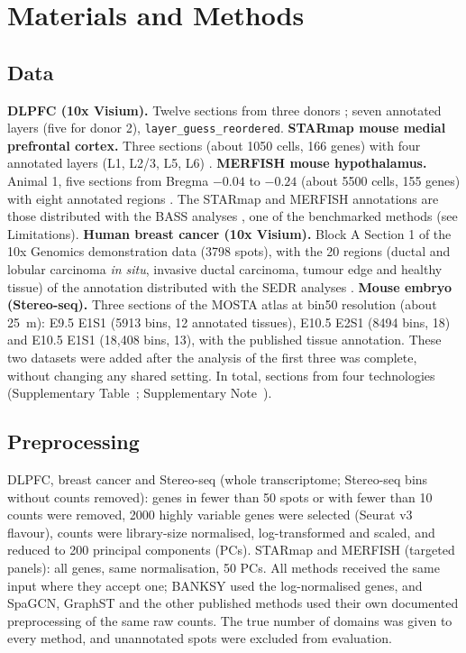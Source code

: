 \documentclass[unnumsec,webpdf,contemporary,large]{oup-authoring-template}
\begin{document}
\section{Materials and Methods}

\subsection{Data}
\textbf{DLPFC (10x Visium).} Twelve sections from three donors \citep{maynard2021dlpfc}; seven
annotated layers (five for donor 2), \texttt{layer\_guess\_reordered}.
\textbf{STARmap mouse medial prefrontal cortex.} Three sections (about 1050 cells, 166 genes) with
four annotated layers (L1, L2/3, L5, L6) \citep{wang2018starmap}.
\textbf{MERFISH mouse hypothalamus.} Animal 1, five sections from Bregma $-0.04$ to $-0.24$ (about
5500 cells, 155 genes) with eight annotated regions \citep{moffitt2018merfish}. The STARmap and
MERFISH annotations are those distributed with the BASS analyses \citep{li2022bass}, one of the benchmarked methods
(see Limitations).
\textbf{Human breast cancer (10x Visium).} Block A Section 1 of the 10x Genomics demonstration data \citep{tenx2020brca}
(3798 spots), with the 20 regions (ductal and lobular carcinoma \emph{in situ}, invasive ductal carcinoma, tumour edge and healthy
tissue) of the annotation distributed with the SEDR analyses \citep{xu2024sedr}.
\textbf{Mouse embryo (Stereo-seq).} Three sections of the MOSTA atlas \citep{chen2022mosta} at bin50 resolution (about 25~\textmu m):
E9.5 E1S1 (5913 bins, 12 annotated tissues), E10.5 E2S1 (8494 bins, 18) and E10.5 E1S1 (18,408 bins, 13), with the published
tissue annotation. These two datasets were added after the analysis of the first three was complete, without changing any shared setting.
In total, \nSections{} sections from four technologies (Supplementary Table~\STqc; Supplementary Note~\SNdata).

\subsection{Preprocessing}
DLPFC, breast cancer and Stereo-seq (whole transcriptome; Stereo-seq bins without counts removed): genes in fewer than 50 spots or with fewer than 10 counts were removed, 2000 highly
variable genes were selected (Seurat v3 flavour), counts were library-size normalised,
log-transformed and scaled, and reduced to 200 principal components (PCs). STARmap and MERFISH
(targeted panels): all genes, same normalisation, 50 PCs. All methods received the same input
where they accept one; BANKSY used the log-normalised genes, and SpaGCN, GraphST and the other published methods
used their own documented preprocessing of the same raw counts. The true number of domains was given to every method,
and unannotated spots were excluded from evaluation.
\end{document}
